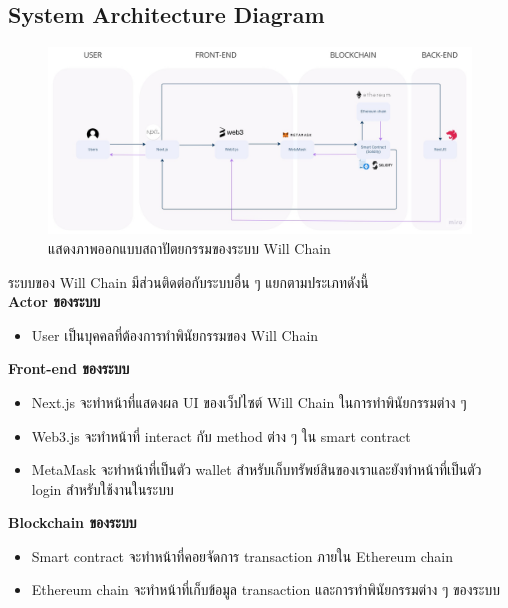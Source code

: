 \documentclass[12pt,oneside,openright,a4paper]{cpe-thai-project}
\begin{document}
\subsection{System Architecture Diagram}
	\begin{figure}[!thb]
		\centering
		\includegraphics[scale=0.2]{systemArch}
		\caption{แสดงภาพออกแบบสถาปัตยกรรมของระบบ Will Chain}
	\end{figure}
	\FloatBarrier
ระบบของ Will Chain มีส่วนติดต่อกับระบบอื่น ๆ แยกตามประเภทดังนี้ \\
\textbf{Actor ของระบบ}
	\begin{itemize}
		\item User เป็นบุคคลที่ต้องการทำพินัยกรรมของ Will Chain
	\end{itemize}
\textbf{Front-end ของระบบ}
	\begin{itemize}
		\item Next.js จะทำหน้าที่แสดงผล UI ของเว็ปไซต์ Will Chain ในการทำพินัยกรรมต่าง ๆ 
		\item Web3.js จะทำหน้าที่ interact กับ method ต่าง ๆ ใน smart contract
		\item MetaMask จะทำหน้าที่เป็นตัว wallet สำหรับเก็บทรัพย์สินของเราและยังทำหน้าที่เป็นตัว login สำหรับใช้งานในระบบ
	\end{itemize}
\textbf{Blockchain ของระบบ}
	\begin{itemize}
		\item Smart contract จะทำหน้าที่คอยจัดการ transaction ภายใน Ethereum chain
		\item Ethereum chain จะทำหน้าที่เก็บข้อมูล transaction และการทำพินัยกรรมต่าง ๆ ของระบบ
	\end{itemize}
\end{document}
